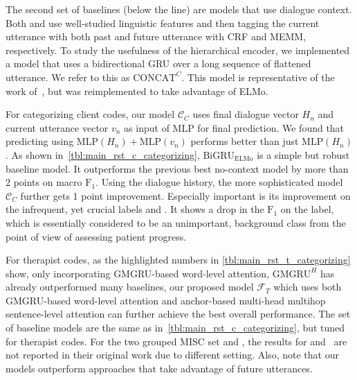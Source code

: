 The second set of baselines (below the line) are models that use
dialogue context.  Both \citet{can2015dialog} and
\citet{tanana2016comparison} use well-studied linguistic features and
then tagging the current utterance with both past and future utterance
with CRF and MEMM, respectively. To study the usefulness of the
hierarchical encoder, we implemented a model that uses a bidirectional
GRU over a long sequence of flattened utterance. We refer to this as
$\text{CONCAT}^{C}$. This model is representative of the work
of~\citet{huang2018modeling}, but was reimplemented to take advantage
of ELMo.





For categorizing client codes, our model $\mathcal{C}_C$ uses final
dialogue vector $H_{n}$ and current utterance vector $v_{n}$ as input
of MLP for final prediction. We found that predicting using
$\text{MLP}(H_{n})+\text{MLP}(v_{n})$ performs better than just
$\text{MLP}({H_{n}})$.  As shown
in~\autoref{tbl:main_rst_c_categorizing}, $\text{BiGRU}_{\text{ELMo}}$
is a simple but robust baseline model. It outperforms the previous
best no-context model by more than 2 points on macro
$\text{F}_{1}$. Using the dialogue history, the more sophisticated
model $\mathcal{C}_{C}$ further gets 1 point improvement. Especially
important is its improvement on the infrequent, yet crucial labels
\CHANGE and \SUSTAIN. It shows a drop in the $\text{F}_{1}$ on the \FN
label, which is essentially considered to be an unimportant,
background class from the point of view of assessing patient progress.
%

For therapist codes, as the highlighted numbers in
\autoref{tbl:main_rst_t_categorizing} show, only incorporating
GMGRU-based word-level attention, $\text{GMGRU}^{H}$ has already
outperformed many baselines, our proposed model $\mathcal{F}_{T}$
which uses both GMGRU-based word-level attention and anchor-based
multi-head multihop sentence-level attention can further achieve the
best overall performance. The set of baseline models are the same as
in~\autoref{tbl:main_rst_c_categorizing}, but tuned for therapist
codes. For the two grouped MISC set \MIA and \MIN, the results for
\citet{can2015dialog} and~\citet{tanana2016comparison} are not
reported in their original work due to different setting. Also, note
that our models outperform approaches that take advantage of future
utterances.

